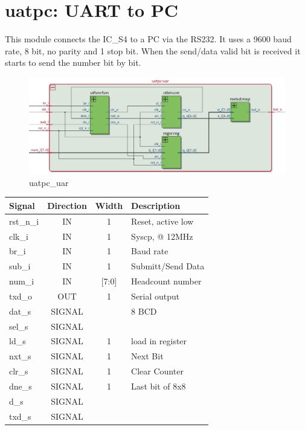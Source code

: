 \documentclass[12pt,a4 paper] {report}
\begin{document}
\section{uatpc: UART to PC}
This module connects the IC\_S4 to a PC via the RS232. It uses a 9600 baud rate, 8 bit, no parity and 1 stop bit. When 
the send/data valid bit is received it starts to send the number bit by bit.
\begin{figure}[h]
	\centering	
	\includegraphics[scale=0.3]{../png/uatpc_uar.png}
	\caption{uatpc\_uar}
\end{figure}
\begin{center}
	\begin{tabular}{ | p{2cm} | c | c | p{5cm} |}
		\hline
		\textbf{Signal} & \textbf{Direction} & \textbf{Width} & \textbf{Description} \\
		\hline	
  	rst\_n\_i & IN & 1 & Reset, active low\\
  	\hline
		clk\_i & IN & 1 & Syscp, @ 12MHz \\
		\hline
		br\_i & IN & 1 & Baud rate \\
		\hline
		sub\_i & IN & 1 & Submitt/Send Data \\
		\hline
		num\_i & IN & [7:0] & Headcount number \\
		\hline
		txd\_o & OUT & 1 & Serial output \\
		\hline
		\hline
		dat\_s & SIGNAL & & 8 BCD \\
		\hline	
		sel\_s & SIGNAL & & \\
		\hline 
		ld\_s & SIGNAL & 1 & load in register\\
		\hline
		nxt\_s & SIGNAL & 1 & Next Bit \\
		\hline
		clr\_s & SIGNAL & 1 &  Clear Counter\\
		\hline
		dne\_s & SIGNAL & 1 & Last bit of 8x8 \\
		\hline
		d\_s & SIGNAL & & \\
		\hline
		txd\_s & SIGNAL & & \\
		\hline
	\end{tabular}
\end{center}
\newpage
\end{document}
